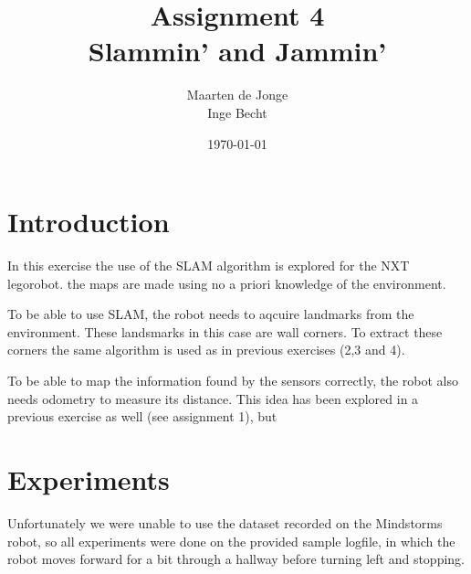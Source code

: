 \documentclass[a4paper, 20pt]{article}
\author{Maarten de Jonge \\
    Inge Becht}
\date{\today}
\title{Assignment 4\\ 
Slammin' and Jammin'}
\begin{document}
\maketitle
\section{Introduction}
In this exercise the use of the SLAM algorithm is explored for the NXT
legorobot. the maps are made using no a priori knowledge of the environment.

To be able to use SLAM, the robot needs to aqcuire landmarks from the
environment. These landsmarks in this case are wall corners. To extract these
corners the same algorithm is used as in previous exercises (2,3 and 4). 

To be able to map the information found by the sensors correctly, the robot also
needs odometry to measure its distance. This idea has been explored in a
previous exercise as well (see assignment 1), but


\section{Experiments}
Unfortunately we were unable to use the dataset recorded on the Mindstorms
robot, so all experiments were done on the provided sample logfile, in which the
robot moves forward for a bit through a hallway before turning left and
stopping.
\end{document}
